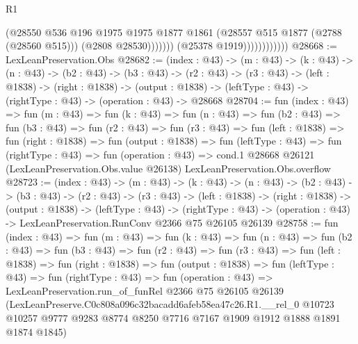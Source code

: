 \begin{lexlean}{R1}
\begin{coremodule}
                                    (@28550
                                      @536
                                      @196
                                      @1975
                                      @1975
                                      @1877
                                      @1861
                                      (@28557 @515 @1877 (@2788 (@28560 @515)))
                                      (@2808 @28530)))))))
                          (@25378 @1919))))))))))))
@28668 := LexLeanPreservation.Obs
@28682 := (index : @43) ->
  (m : @43) ->
  (k : @43) ->
  (n : @43) ->
  (b2 : @43) ->
  (b3 : @43) ->
  (r2 : @43) ->
  (r3 : @43) ->
  (left : @1838) ->
  (right : @1838) ->
  (output : @1838) -> (leftType : @43) -> (rightType : @43) -> (operation : @43) -> @28668
@28704 := fun (index : @43) =>
  fun (m : @43) =>
  fun (k : @43) =>
  fun (n : @43) =>
  fun (b2 : @43) =>
  fun (b3 : @43) =>
  fun (r2 : @43) =>
  fun (r3 : @43) =>
  fun (left : @1838) =>
  fun (right : @1838) =>
  fun (output : @1838) =>
  fun (leftType : @43) =>
  fun (rightType : @43) =>
  fun (operation : @43) =>
  cond.{1} @28668 @26121 (LexLeanPreservation.Obs.value @26138) LexLeanPreservation.Obs.overflow
@28723 := (index : @43) ->
  (m : @43) ->
  (k : @43) ->
  (n : @43) ->
  (b2 : @43) ->
  (b3 : @43) ->
  (r2 : @43) ->
  (r3 : @43) ->
  (left : @1838) ->
  (right : @1838) ->
  (output : @1838) ->
  (leftType : @43) ->
  (rightType : @43) -> (operation : @43) -> LexLeanPreservation.RunConv @2366 @75 @26105 @26139
@28758 := fun (index : @43) =>
  fun (m : @43) =>
  fun (k : @43) =>
  fun (n : @43) =>
  fun (b2 : @43) =>
  fun (b3 : @43) =>
  fun (r2 : @43) =>
  fun (r3 : @43) =>
  fun (left : @1838) =>
  fun (right : @1838) =>
  fun (output : @1838) =>
  fun (leftType : @43) =>
  fun (rightType : @43) =>
  fun (operation : @43) =>
  LexLeanPreservation.run_of_funRel
    @2366
    @75
    @26105
    @26139
    (LexLeanPreserve.C0c808a096c32bacadd6afeb58ea47c26.R1.__rel_0
      @10723
      @10257
      @9777
      @9283
      @8774
      @8250
      @7716
      @7167
      @1909
      @1912
      @1888
      @1891
      @1874
      @1845)
\end{coremodule}
\end{lexlean}
